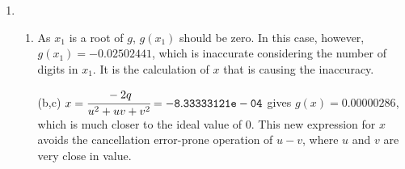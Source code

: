 \documentclass[12pt,letterpaper]{article}
\begin{document}
\begin{enumerate}
\begin{enumerate}
    \end{enumerate}
  \item
    \begin{enumerate}
      \item As $x_1$ is a root of $g$, $g(x_1)$ should be zero. In this case,
        however, $g(x_1) = -0.02502441$, which is inaccurate considering the
        number of digits in $x_1$. It is the calculation of $x$ that is causing
        the inaccuracy.
      \item[(b,c)] $x = \cfrac{-2q}{u^2+uv+v^2} = {\tt -8.33333121e-04}$ gives
        $g(x) = 0.00000286$, which is much closer to the ideal value of $0$.
        This new expression for $x$ avoids the cancellation error-prone
        operation of $u-v$, where $u$ and $v$ are very close in value.
    \end{enumerate}
\end{enumerate}
\end{document}
